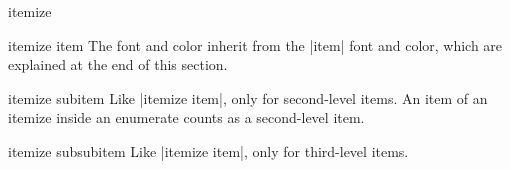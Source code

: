 \begin{environment}{{itemize}}
\begin{element}{itemize item}
    The font and color inherit from the |item| font and color, which
    are explained at the end of this section.
  \end{element}

  \begin{element}{itemize subitem}\yes\yes\yes
    Like |itemize item|, only for second-level items. An
    item of an itemize inside an enumerate counts as a second-level item.
  \end{element}

  \begin{element}{itemize subsubitem}\yes\yes\yes
    Like |itemize item|, only for third-level items.
  \end{element}
\end{environment}




